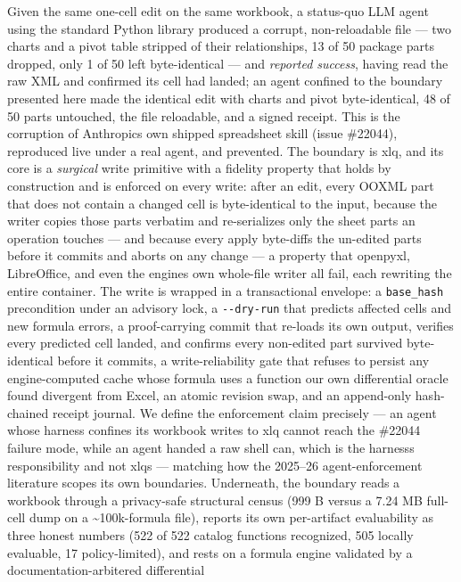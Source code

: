 \documentclass[
]{article}
\begin{document}
Given the same one-cell edit on the same workbook, a status-quo LLM
agent using the standard Python library produced a corrupt,
non-reloadable file --- two charts and a pivot table stripped of their
relationships, 13 of 50 package parts dropped, only 1 of 50 left
byte-identical --- and \emph{reported success}, having read the raw XML
and confirmed its cell had landed; an agent confined to the boundary
presented here made the identical edit with charts and pivot
byte-identical, 48 of 50 parts untouched, the file reloadable, and a
signed receipt. This is the corruption of Anthropic\textquotesingle s
own shipped spreadsheet skill (issue \#22044), reproduced live under a
real agent, and prevented. The boundary is xlq, and its core is a
\emph{surgical} write primitive with a fidelity property that holds by
construction and is enforced on every write: after an edit, every OOXML
part that does not contain a changed cell is byte-identical to the
input, because the writer copies those parts verbatim and re-serializes
only the sheet parts an operation touches --- and because every apply
byte-diffs the un-edited parts before it commits and aborts on any
change --- a property that openpyxl, LibreOffice, and even the
engine\textquotesingle s own whole-file writer all fail, each rewriting
the entire container. The write is wrapped in a transactional envelope:
a \texttt{base\_hash} precondition under an advisory lock, a
\texttt{-\/-dry-run} that predicts affected cells and new formula
errors, a proof-carrying commit that re-loads its own output, verifies
every predicted cell landed, and confirms every non-edited part survived
byte-identical before it commits, a write-reliability gate that refuses
to persist any engine-computed cache whose formula uses a function our
own differential oracle found divergent from Excel, an atomic revision
swap, and an append-only hash-chained receipt journal. We define the
enforcement claim precisely --- an agent whose harness confines its
workbook writes to xlq cannot reach the \#22044 failure mode, while an
agent handed a raw shell can, which is the harness\textquotesingle s
responsibility and not xlq\textquotesingle s --- matching how the
2025--26 agent-enforcement literature scopes its own boundaries.
Underneath, the boundary reads a workbook through a privacy-safe
structural census (999 B versus a 7.24 MB full-cell dump on a
\textasciitilde100k-formula file), reports its own per-artifact
evaluability as three honest numbers (522 of 522 catalog functions
recognized, 505 locally evaluable, 17 policy-limited), and rests on a
formula engine validated by a documentation-arbitered differential
\end{document}
